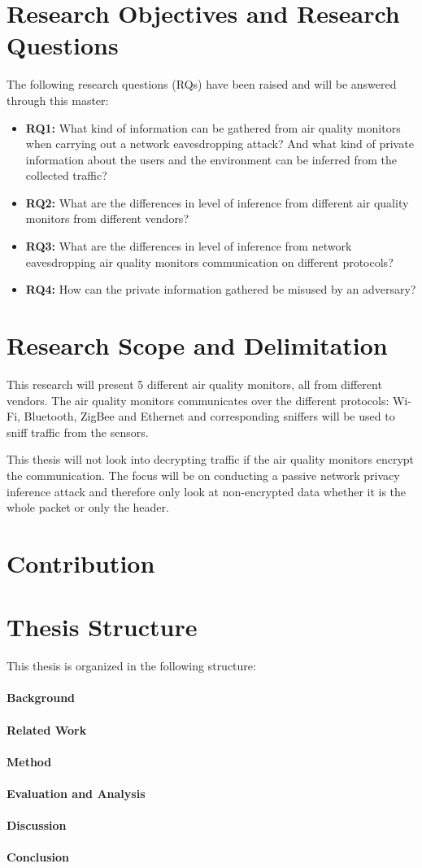\section*{Research Objectives and Research Questions}

The following research questions (RQs) have been raised and will be answered through this master:
\begin{itemize}
    \item 
    \textbf{RQ1:} What kind of information can be gathered from air quality monitors when carrying out a network eavesdropping attack? And what kind of private information about the users and the environment can be inferred from the collected traffic?\\
    \item 
    \textbf{RQ2:} What are the differences in level of inference from different air quality monitors from different vendors?\\
    \item
    \textbf{RQ3:} What are the differences in level of inference from network eavesdropping air quality monitors communication on different protocols?\\
    \item 
    \textbf{RQ4:} How can the private information gathered be misused by an adversary?\\
\end{itemize}

\section*{Research Scope and Delimitation}
This research will present 5 different air quality monitors, all from different vendors. The air quality monitors communicates over the different protocols: Wi-Fi, Bluetooth, ZigBee and Ethernet and corresponding sniffers will be used to sniff traffic from the sensors. 

This thesis will not look into decrypting traffic if the air quality monitors encrypt the communication. The focus will be on conducting a passive network privacy inference attack and therefore only look at non-encrypted data whether it is the whole packet or only the header. 

\section*{Contribution}

\section*{Thesis Structure}
This thesis is organized in the following structure:\\\\
\textbf{Background}
\\\\
\textbf{Related Work}
\\\\
\textbf{Method}
\\\\
\textbf{Evaluation and Analysis}
\\\\
\textbf{Discussion}
\\\\
\textbf{Conclusion}